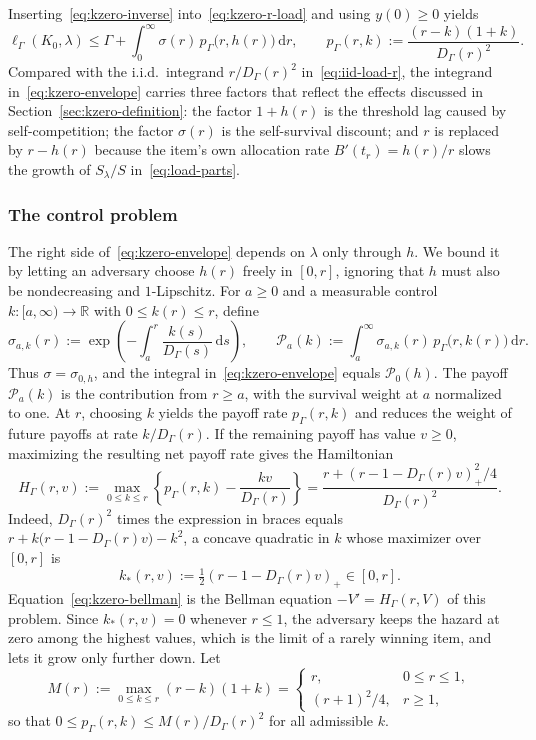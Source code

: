 \documentclass[11pt]{article}
\theoremstyle{definition}
\theoremstyle{remark}
\newcommand{\R}{\mathbb R}
\newcommand{\dd}{\,\mathrm d}
\newcommand{\pos}[1]{\left(#1\right)_+}
\begin{document}
Inserting~\eqref{eq:kzero-inverse} into~\eqref{eq:kzero-r-load} and using $y(0)\ge0$ yields
\begin{equation}\label{eq:kzero-envelope}
 \ell_\Gamma(K_0,\lambda)
 \le\Gamma+\int_0^\infty\sigma(r)\,p_\Gamma\bigl(r,h(r)\bigr)\dd r,
 \qquad
 p_\Gamma(r,k):=\frac{(r-k)(1+k)}{D_\Gamma(r)^2}.
\end{equation}
Compared with the i.i.d.\ integrand $r/D_\Gamma(r)^2$ in~\eqref{eq:iid-load-r}, the integrand in~\eqref{eq:kzero-envelope} carries three factors that reflect the effects discussed in Section~\ref{sec:kzero-definition}: the factor $1+h(r)$ is the threshold lag caused by self-competition; the factor $\sigma(r)$ is the self-survival discount; and $r$ is replaced by $r-h(r)$ because the item's own allocation rate $B'(t_r)=h(r)/r$ slows the growth of $S_\lambda/S$ in~\eqref{eq:load-parts}.

\subsubsection{The control problem}\label{sec:kzero-control}

The right side of~\eqref{eq:kzero-envelope} depends on $\lambda$ only through $h$.
We bound it by letting an adversary choose $h(r)$ freely in $[0,r]$, ignoring that $h$ must also be nondecreasing and $1$-Lipschitz.
For $a\ge0$ and a measurable control $k:[a,\infty)\to\R$ with $0\le k(r)\le r$, define
\[
 \sigma_{a,k}(r):=\exp\!\left(-\int_a^r\frac{k(s)}{D_\Gamma(s)}\dd s\right),
 \qquad
 \mathcal P_a(k):=\int_a^\infty\sigma_{a,k}(r)\,p_\Gamma\bigl(r,k(r)\bigr)\dd r.
\]
Thus $\sigma=\sigma_{0,h}$, and the integral in~\eqref{eq:kzero-envelope} equals $\mathcal P_0(h)$.
The payoff $\mathcal P_a(k)$ is the contribution from $r\ge a$,
with the survival weight at $a$ normalized to one.
At $r$, choosing $k$ yields the payoff rate $p_\Gamma(r,k)$
and reduces the weight of future payoffs at rate $k/D_\Gamma(r)$.
If the remaining payoff has value $v\ge0$, maximizing the resulting
net payoff rate gives the Hamiltonian
\begin{equation}\label{eq:kzero-hamiltonian}
 H_\Gamma(r,v)
 :=\max_{0\le k\le r}
   \left\{p_\Gamma(r,k)-\frac{kv}{D_\Gamma(r)}\right\}
 =\frac{r+\pos{r-1-D_\Gamma(r)v}^2/4}{D_\Gamma(r)^2}.
\end{equation}
Indeed, $D_\Gamma(r)^2$ times the expression in braces equals $r+k\bigl(r-1-D_\Gamma(r)v\bigr)-k^2$, a concave quadratic in $k$ whose maximizer over $[0,r]$ is
\[
 k_*(r,v):=\tfrac12\pos{r-1-D_\Gamma(r)v}\in[0,r].
\]
Equation~\eqref{eq:kzero-bellman} is the Bellman equation $-V'=H_\Gamma(r,V)$ of this problem.
Since $k_*(r,v)=0$ whenever $r\le1$, the adversary keeps the hazard at zero among the highest values, which is the limit of a rarely winning item, and lets it grow only further down.
Let
\[
 M(r):=\max_{0\le k\le r}(r-k)(1+k)
 =\begin{cases}
 r,&0\le r\le1,\\
 (r+1)^2/4,&r\ge1,
 \end{cases}
\]
so that $0\le p_\Gamma(r,k)\le M(r)/D_\Gamma(r)^2$ for all admissible $k$.
\end{document}

